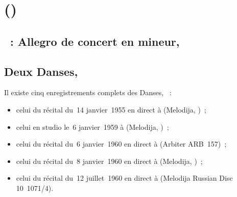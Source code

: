 \chapter[%
Aleksandr Skrjabin (\Dates{1872-01-06}{1915-04-27})][%
Aleksandr Skrjabin]{%
\AScriabine{} ()}
\label{chap:Scriabine}

\section{\ifChrono \Scriabine{}~: \fi
Allegro de concert en \kB \Flat mineur, }
\label{\thesection}

\begin{workitemize}
 \item{}
 \begin{perfitemize}
  \item{}
  \item{}
 \end{perfitemize}
\end{workitemize}

\section*{%
Deux Danses, }

Il existe cinq enregistrements complets des Danses, ~:
\begin{itemize}
 \item
 celui du récital du~14 janvier~1955 en direct à \MCGH (Melodija, )~;
 \item
 celui en studio le~6 janvier~1959 à \Moscow (Melodija, )~;
 \item
 celui du récital du~6 janvier~1960 en direct à \MSHM (Arbiter ARB~157)~;
 \item
 celui du récital du~8 janvier~1960 en direct à \MCSH (Melodija, )~;
 \item
 celui du récital du~12 juillet~1960 en direct à \MSHM (Melodija Russian
 Disc 10~1071/4).
\end{itemize}

